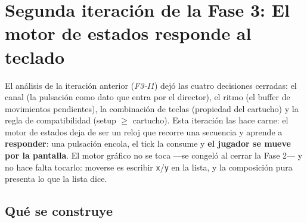 \section{Segunda iteración de la Fase 3: El motor de estados responde al teclado}
\label{sec:MotorRespondeTeclado}

El análisis de la iteración anterior (\emph{F3-I1}) dejó las cuatro decisiones cerradas:
el canal (la pulsación como dato que entra por el director), el ritmo (el buffer de
movimientos pendientes), la combinación de teclas (propiedad del cartucho) y la regla de
compatibilidad (setup $\geq$ cartucho). Esta iteración las hace carne: el motor de estados
deja de ser un reloj que recorre una secuencia y aprende a \textbf{responder}: una
pulsación encola, el tick la consume y \textbf{el jugador se mueve por la pantalla}. El
motor gráfico no se toca ---se congeló al cerrar la Fase 2--- y no hace falta tocarlo:
moverse es escribir \texttt{x}/\texttt{y} en la lista, y la composición pura presenta lo
que la lista dice.

\subsection{Qué se construye}
\label{subsec:QueSeConstruyeF3I2}

